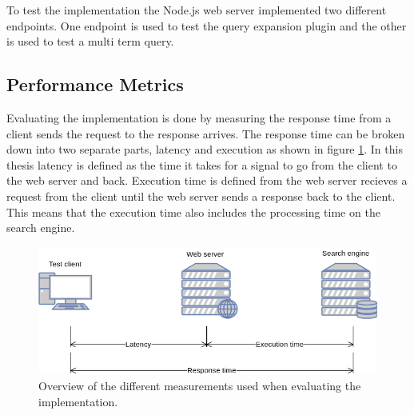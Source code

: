 To test the implementation the Node.js web server implemented two different endpoints.
One endpoint is used to test the query expansion plugin and the other is used to test a multi term query.



\subsection{Performance Metrics}
Evaluating the implementation is done by measuring the response time from a client sends the request to the response arrives.
The response time can be broken down into two separate parts, latency and execution as shown in figure \ref{fig:latency-measurements}.
In this thesis latency is defined as the time it takes for a signal to go from the client to the web server and back.
Execution time is defined from the web server recieves a request from the client until the web server sends a response back to the client.
This means that the execution time also includes the processing time on the search engine.


\begin{figure}[h!]
  \centering \includegraphics[width=0.9\linewidth]{img/latency-measurements.png}
  \caption{Overview of the different measurements used when evaluating the implementation.}
  \label{fig:latency-measurements}
\end{figure}

